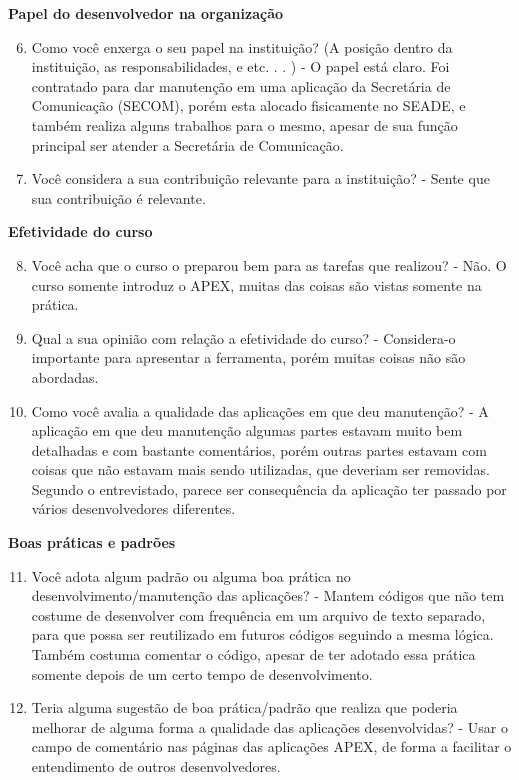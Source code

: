 \begin{apendicesenv}
\textbf{Papel do desenvolvedor na organização}

\begin{enumerate}
	\setcounter{enumi}{5}
	\item Como você enxerga o seu papel na instituição? (A posição dentro da instituição, as
	responsabilidades, e etc. . . )\newline
	-  O papel está claro. Foi contratado para dar manutenção em uma aplicação da Secretária de Comunicação (SECOM), porém esta alocado fisicamente no SEADE, e também realiza alguns trabalhos para o mesmo, apesar de sua função principal ser atender a Secretária de Comunicação.
	\item Você considera a sua contribuição relevante para a instituição?\newline
	- Sente que sua contribuição é relevante.
\end{enumerate}

\textbf{Efetividade do curso}

\begin{enumerate}
	\setcounter{enumi}{7}
	\item Você acha que o curso o preparou bem para as tarefas que realizou?\newline
	- Não. O curso somente introduz o APEX, muitas das coisas são vistas somente na prática.
	\item Qual a sua opinião com relação a efetividade do curso?\newline
	- Considera-o importante para apresentar a ferramenta, porém muitas coisas não são abordadas.
	\item Como você avalia a qualidade das aplicações em que deu manutenção?\newline
	- A aplicação em que deu manutenção algumas partes estavam muito bem detalhadas e com bastante comentários, porém outras partes estavam com coisas que não estavam mais sendo utilizadas, que deveriam ser removidas. Segundo o entrevistado, parece ser consequência da aplicação ter passado por vários desenvolvedores diferentes.
\end{enumerate}

\textbf{Boas práticas e padrões}

\begin{enumerate}
	\setcounter{enumi}{10}
	\item Você adota algum padrão ou alguma boa prática no desenvolvimento/manutenção das
	aplicações?\newline
	- Mantem códigos que não tem costume de desenvolver com frequência em um arquivo de texto separado, para que possa ser reutilizado em futuros códigos seguindo a mesma lógica. Também costuma comentar o código, apesar de ter adotado essa prática somente depois de um certo tempo de desenvolvimento.
	\item Teria alguma sugestão de boa prática/padrão que realiza que poderia melhorar de
	alguma forma a qualidade das aplicações desenvolvidas?\newline
	- Usar o campo de comentário nas páginas das aplicações APEX, de forma a facilitar o entendimento de outros desenvolvedores.
\end{enumerate}


\end{apendicesenv}
